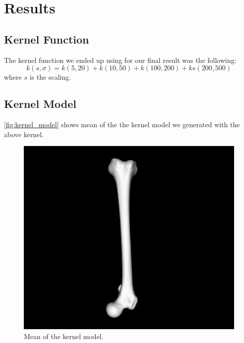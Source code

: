 \section{Results}
\label{sec:results}



\subsection{Kernel Function}
\label{subsec:kernfunc}
The kernel function we ended up using for our final result was the following: 
\begin{equation}
k(s, \sigma) = k(5, 20) + k(10, 50) + k(100, 200) + ks(200, 500)
\end{equation}
where $s$ is the scaling.


\subsection{Kernel Model}
\label{subsec:kernmodel}
\autoref{fig:kernel_model} shows mean of the the kernel model we generated with the above kernel.
\begin{figure}
	\centering
  \includegraphics[scale=0.7]{./Figures/kernel_model}
  \caption{Mean of the kernel model.}
  \label{fig:kernel_model}
\end{figure}

